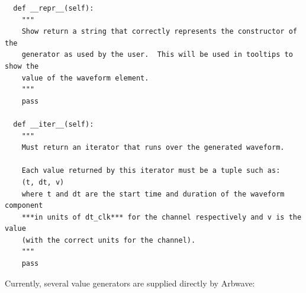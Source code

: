 \begin{lstlisting}
  def __repr__(self):
    """
    Show return a string that correctly represents the constructor of the
    generator as used by the user.  This will be used in tooltips to show the
    value of the waveform element.
    """
    pass

  def __iter__(self):
    """
    Must return an iterator that runs over the generated waveform.

    Each value returned by this iterator must be a tuple such as:
    (t, dt, v)
    where t and dt are the start time and duration of the waveform component
    ***in units of dt_clk*** for the channel respectively and v is the value
    (with the correct units for the channel).
    """
    pass

\end{lstlisting}
%
Currently, several value generators are supplied directly by Arbwave:
